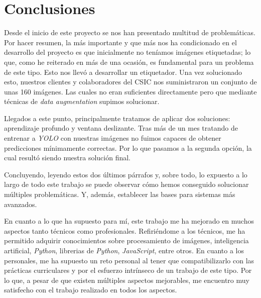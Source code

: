 

\section{Conclusiones}

Desde el inicio de este proyecto se nos han presentado multitud de problemáticas. Por hacer resumen, la más importante y que más nos ha condicionado en el desarrollo del proyecto es que inicialmente no teníamos imágenes etiquetadas; lo que, como he reiterado en más de una ocasión, es fundamental para un problema de este tipo. Esto nos llevó a desarrollar un etiquetador. Una vez solucionado esto, nuestros clientes y colaboradores del CSIC nos suministraron un conjunto de unas 160 imágenes. Las cuales no eran suficientes directamente pero que mediante técnicas de \textit{data augmentation} supimos solucionar.

Llegados a este punto, principalmente tratamos de aplicar dos soluciones: aprendizaje profundo y ventana deslizante. Tras más de un mes tratando de entrenar a \textit{YOLO} con nuestras imágenes no fuimos capaces de obtener predicciones mínimamente correctas. Por lo que pasamos a la segunda opción, la cual resultó siendo nuestra solución final.

Concluyendo, leyendo estos dos últimos párrafos y, sobre todo, lo expuesto a lo largo de todo este trabajo se puede observar cómo hemos conseguido solucionar múltiples problemáticas. Y, además, establecer las bases para sistemas más avanzados.

En cuanto a lo que ha supuesto para mí, este trabajo me ha mejorado en muchos aspectos tanto técnicos como profesionales. Refiriéndome a los técnicos, me ha permitido adquirir conocimientos sobre procesamiento de imágenes, inteligencia artificial, \textit{Python}, librerias de \textit{Python}, \textit{JavaScript}, entre otros. En cuanto a los personales, me ha supuesto un reto personal al tener que compatibilizarlo con las prácticas curriculares y por el esfuerzo intrínseco de un trabajo de este tipo. Por lo que, a pesar de que existen múltiples aspectos mejorables, me encuentro muy satisfecho con el trabajo realizado en todos los aspectos.

